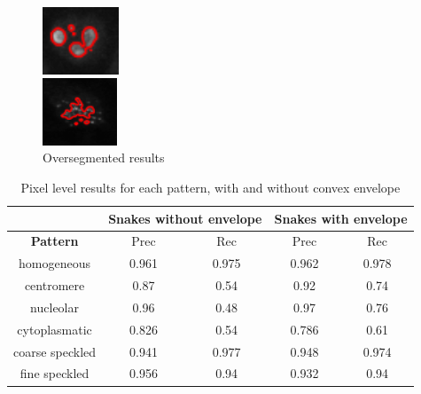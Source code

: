 \begin{figure}
	\begin{minipage}[h]{0.49\linewidth}
		\begin{flushright}
			\includegraphics[height=2cm]{Figures/segmentation/oversegmented_nucleolar}
		\end{flushright}
	\end{minipage}
	\hspace{0.3cm}
	\begin{minipage}[h]{0.49\linewidth}
		\begin{flushleft}
			\includegraphics[height=2cm]{Figures/segmentation/oversegmented_centromere}
		\end{flushleft}
	\end{minipage}
	\caption{Oversegmented results}
	\label{img:oversegmentedSnakes}
\end{figure}

\begin{table}
	\begin{center}
	\caption{Pixel level results for each pattern, with and without convex envelope}
	\label{tab:SnakesPix}
	\begin{tabular}{|c||c|c||c|c|}
	\hline
	 & \multicolumn{2}{c}{Snakes without envelope} & \multicolumn{2}{c}{Snakes with envelope}  \\
	\hline
	 \textbf{Pattern} & Prec & Rec & Prec & Rec\\
	 \hline
	 \hline
	 homogeneous & 0.961 & 0.975 &  0.962 & 0.978  \\
	 centromere & 0.87 & 0.54 & 0.92 & 0.74  \\
	 nucleolar & 0.96 & 0.48 & 0.97 & 0.76  \\
	 cytoplasmatic & 0.826 & 0.54 & 0.786 & 0.61 \\
	 coarse speckled & 0.941 & 0.977 & 0.948 & 0.974 \\
	 fine speckled & 0.956 & 0.94 & 0.932 & 0.94 \\
	 \hline
	\end{tabular}
	\end{center}
\end{table}

